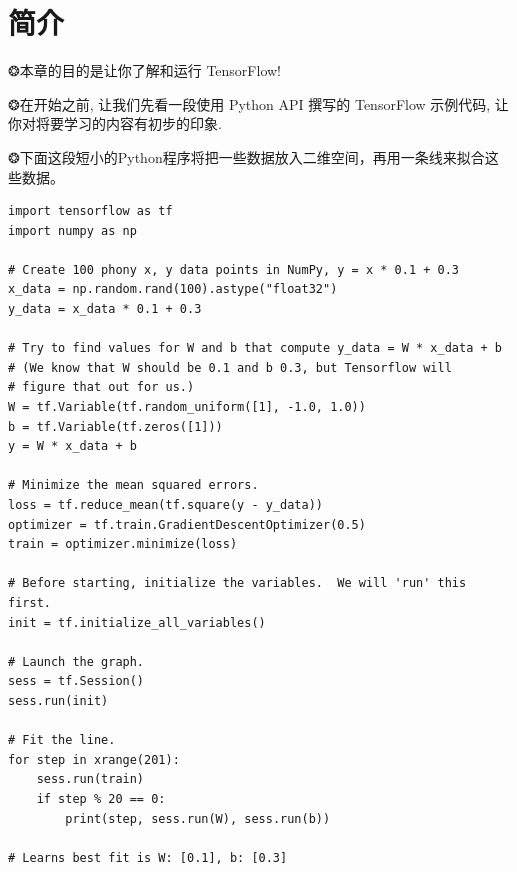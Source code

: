 
\section{简介}

❂本章的目的是让你了解和运行 TensorFlow!


❂在开始之前, 让我们先看一段使用 Python API 撰写的 TensorFlow 示例代码,
让你对将要学习的内容有初步的印象.


❂下面这段短小的Python程序将把一些数据放入二维空间，再用一条线来拟合这些数据。

\begin{lstlisting}
import tensorflow as tf
import numpy as np

# Create 100 phony x, y data points in NumPy, y = x * 0.1 + 0.3
x_data = np.random.rand(100).astype("float32")
y_data = x_data * 0.1 + 0.3

# Try to find values for W and b that compute y_data = W * x_data + b
# (We know that W should be 0.1 and b 0.3, but Tensorflow will
# figure that out for us.)
W = tf.Variable(tf.random_uniform([1], -1.0, 1.0))
b = tf.Variable(tf.zeros([1]))
y = W * x_data + b

# Minimize the mean squared errors.
loss = tf.reduce_mean(tf.square(y - y_data))
optimizer = tf.train.GradientDescentOptimizer(0.5)
train = optimizer.minimize(loss)

# Before starting, initialize the variables.  We will 'run' this first.
init = tf.initialize_all_variables()

# Launch the graph.
sess = tf.Session()
sess.run(init)

# Fit the line.
for step in xrange(201):
    sess.run(train)
    if step % 20 == 0:
        print(step, sess.run(W), sess.run(b))

# Learns best fit is W: [0.1], b: [0.3]
\end{lstlisting}


